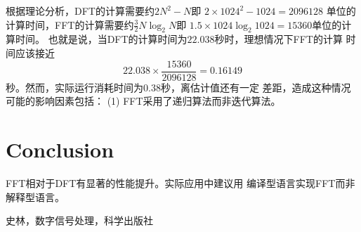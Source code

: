 \documentclass[12pt, a4paper]{article}
\begin{document}
\begin{CJK}{UTF8}{gkai}
根据理论分析，DFT的计算需要约$2N^2-N$即
$2\times 1024^2-1024 = 2096128$
单位的计算时间，FFT的计算需要约$\frac{3}{2}N \log_2 N$即
$1.5 \times 1024 \log_2 1024 = 15360$单位的计算时间。
也就是说，当DFT的计算时间为$22.038$秒时，理想情况下FFT的计算
时间应该接近
\[ 22.038 \times \frac{15360}{2096128} = 0.16149\]
秒。然而，实际运行消耗时间为$0.38$秒，离估计值还有一定
差距，造成这种情况可能的影响因素包括：
(1) FFT采用了递归算法而非迭代算法。

\section{Conclusion}
FFT相对于DFT有显著的性能提升。实际应用中建议用
编译型语言实现FFT而非解释型语言。

\begin{thebibliography}{9}
 史林，数字信号处理，科学出版社
\end{thebibliography}

\end{CJK}
\end{document}
